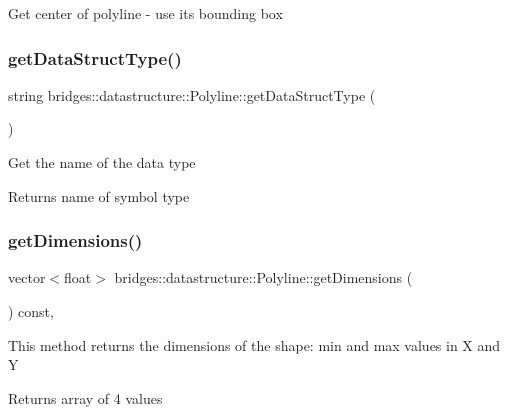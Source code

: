 Get center of polyline -\/ use its bounding box \mbox{\label{classbridges_1_1datastructure_1_1_polyline_a49b37ad55cf64fe759ee5a0f46e2e0cc}} 
\subsubsection{\texorpdfstring{get\+Data\+Struct\+Type()}{getDataStructType()}}
{\footnotesize\ttfamily string bridges\+::datastructure\+::\+Polyline\+::get\+Data\+Struct\+Type (\begin{DoxyParamCaption}{ }\end{DoxyParamCaption})\hspace{0.3cm}{\ttfamily [inline]}}

Get the name of the data type \begin{DoxyReturn}{Returns}
name of symbol type 
\end{DoxyReturn}
\mbox{\label{classbridges_1_1datastructure_1_1_polyline_aefa5c986d003c9bde234e230a6bd8bd8}} 
\subsubsection{\texorpdfstring{get\+Dimensions()}{getDimensions()}}
{\footnotesize\ttfamily vector$<$float$>$ bridges\+::datastructure\+::\+Polyline\+::get\+Dimensions (\begin{DoxyParamCaption}{ }\end{DoxyParamCaption}) const\hspace{0.3cm}{\ttfamily [inline]}, {\ttfamily [virtual]}}

This method returns the dimensions of the shape\+: min and max values in X and Y

\begin{DoxyReturn}{Returns}
array of 4 values 
\end{DoxyReturn}


